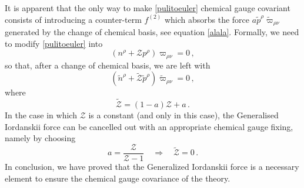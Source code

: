 \documentclass[preprints,article,accept,moreauthors,pdftex]{mdpi}
\begin{document}
It is apparent that the only way to make \eqref{pulitoeuler} chemical gauge covariant consists of introducing a counter-term $f^{(2)}$ which absorbs the force $a \tilde{p}^\rho \tilde{\varpi}_{\rho \nu}$ generated by the change of chemical basis, see equation \eqref{alala}. Formally, we need to modify \eqref{pulitoeuler} into
\begin{equation}
(n^\rho +\mathcal{Z}p^\rho) \varpi_{\rho \nu} =0 \, ,
\end{equation}
so that, after a change of chemical basis, we are left with
\begin{equation}
(\tilde{n}^\rho +\tilde{\mathcal{Z}}\tilde{p}^\rho) \tilde{\varpi}_{\rho \nu} =0 \, ,
\end{equation}
where
\begin{equation}\label{ZZZZZZZ}
\tilde{\mathcal{Z}}= (1-a)\mathcal{Z}+a \, .
\end{equation}
In the case in which $\mathcal{Z}$ is a constant (and only in this case), the Generalised Iordanskii force can be cancelled out with an appropriate chemical gauge fixing, namely by choosing 
\begin{equation}
\label{ZZZZZZZa}
 a= \dfrac{\mathcal{Z}}{\mathcal{Z}-1} \quad \Rightarrow \quad  \tilde{\mathcal{Z}}=0 \,  .
\end{equation}
%
%
In conclusion, we have proved that the Generalized Iordanskii force is a necessary element to ensure the chemical gauge covariance of the theory.
\end{document}
